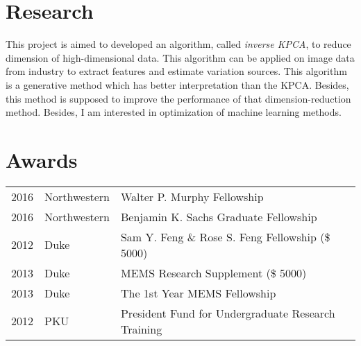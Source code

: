 \documentclass[]{20161017-v}
\begin{document}
\begin{minipage}[t]{0.66\textwidth}

\section{Research}
This project is aimed to developed an algorithm, called \textit{inverse KPCA}, to reduce dimension of high-dimensional data. This algorithm can be applied on image data from industry to extract features and estimate variation sources. This algorithm is a generative method which has better interpretation than the KPCA. Besides, this method is supposed to improve the performance of that dimension-reduction method. Besides, I am interested in optimization of machine learning methods. 
\sectionsep



\section{Awards} 
\begin{tabular}{rll}
2016  &Northwestern     & Walter P. Murphy Fellowship\\
2016  &Northwestern    & Benjamin K. Sachs Graduate Fellowship\\
2012  &Duke & Sam Y. Feng \& Rose S. Feng Fellowship (\$ 5000)\\
2013  &Duke  & MEMS Research Supplement (\$ 5000)\\
2013  &Duke  & The 1st Year MEMS Fellowship  \\
2012  &PKU & President Fund for Undergraduate Research Training \\
\end{tabular}
\sectionsep


\end{minipage}
\end{document}
